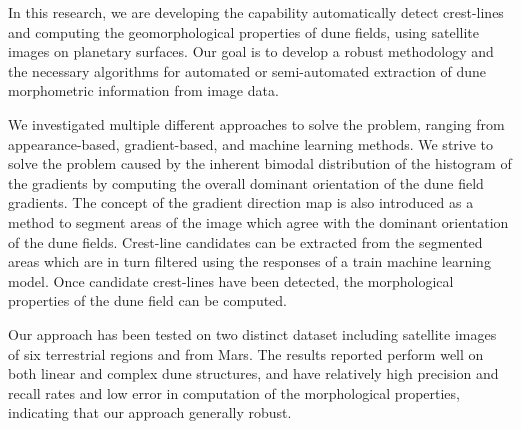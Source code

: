 \documentclass[11pt]{article}
\begin{document}
In this research, we are developing the capability automatically detect crest-lines and computing the geomorphological properties of dune fields, using satellite images on planetary surfaces. Our goal is to develop a robust methodology and the necessary algorithms for automated or semi-automated extraction of dune morphometric information from image data.

We investigated multiple different approaches to solve the problem, ranging from appearance-based, gradient-based, and machine learning methods. We strive to solve the problem caused by the inherent bimodal distribution of the histogram of the gradients by computing the overall dominant orientation of the dune field gradients. The concept of the gradient direction map is also introduced as a method to segment areas of the image which agree with the dominant orientation of the dune fields. Crest-line candidates can be extracted from the segmented areas which are in turn filtered using the responses of a train machine learning model. Once candidate crest-lines have been detected, the morphological properties of the dune field can be computed.

Our approach has been tested on two distinct dataset including satellite images of six terrestrial regions and from Mars. The results reported perform well on both linear and complex dune structures, and have relatively high precision and recall rates and low error in computation of the morphological properties, indicating that our approach generally robust.

\newpage

\tableofcontents
\newpage

\listoffigures
\newpage

\listoftables
\newpage



\newpage

\newpage

\newpage

\newpage


{}

	
\end{document}
